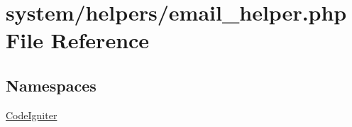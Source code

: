 \hypertarget{email__helper_8php}{}\section{system/helpers/email\+\_\+helper.php File Reference}
\label{email__helper_8php}
\subsection*{Namespaces}
\begin{DoxyCompactItemize}
\item 
 \mbox{\hyperlink{namespace_code_igniter}{Code\+Igniter}}
\end{DoxyCompactItemize}
